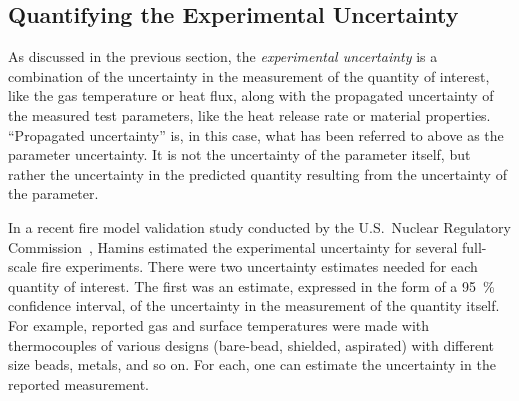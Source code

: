 \subsection{Quantifying the Experimental Uncertainty}

As discussed in the previous section, the {\em experimental uncertainty} is a combination of the uncertainty
in the measurement of the quantity of interest, like the gas temperature or heat flux, along with the propagated
uncertainty of the measured test parameters, like the heat release rate or material properties.
``Propagated uncertainty'' is, in this case, what has been referred to above as the parameter uncertainty.
It is not the uncertainty of the parameter itself, but rather the uncertainty in the predicted quantity
resulting from the uncertainty of the parameter.

In a recent fire model validation study conducted by the U.S.~Nuclear Regulatory Commission~\cite{NUREG_1824},
Hamins estimated the experimental uncertainty for several full-scale fire experiments. There were
two uncertainty estimates needed for each quantity of interest. The first was an estimate, expressed in the
form of a 95~\% confidence interval, of the
uncertainty in the measurement of the quantity itself. For example, reported gas and surface temperatures
were made with thermocouples of various designs (bare-bead,
shielded, aspirated) with different size beads, metals, and so on. For each, one can estimate the
uncertainty in the reported measurement.

